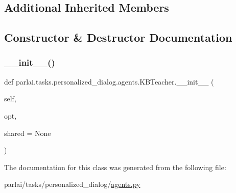 \subsection*{Additional Inherited Members}


\subsection{Constructor \& Destructor Documentation}
\mbox{\label{classparlai_1_1tasks_1_1personalized__dialog_1_1agents_1_1KBTeacher_a1e5c4c2117b3fee7d37aa919d961b2f2}} 
\subsubsection{\texorpdfstring{\+\_\+\+\_\+init\+\_\+\+\_\+()}{\_\_init\_\_()}}
{\footnotesize\ttfamily def parlai.\+tasks.\+personalized\+\_\+dialog.\+agents.\+K\+B\+Teacher.\+\_\+\+\_\+init\+\_\+\+\_\+ (\begin{DoxyParamCaption}\item[{}]{self,  }\item[{}]{opt,  }\item[{}]{shared = {\ttfamily None} }\end{DoxyParamCaption})}



The documentation for this class was generated from the following file\+:\begin{DoxyCompactItemize}
\item 
parlai/tasks/personalized\+\_\+dialog/\hyperlink{parlai_2tasks_2personalized__dialog_2agents_8py}{agents.\+py}\end{DoxyCompactItemize}

